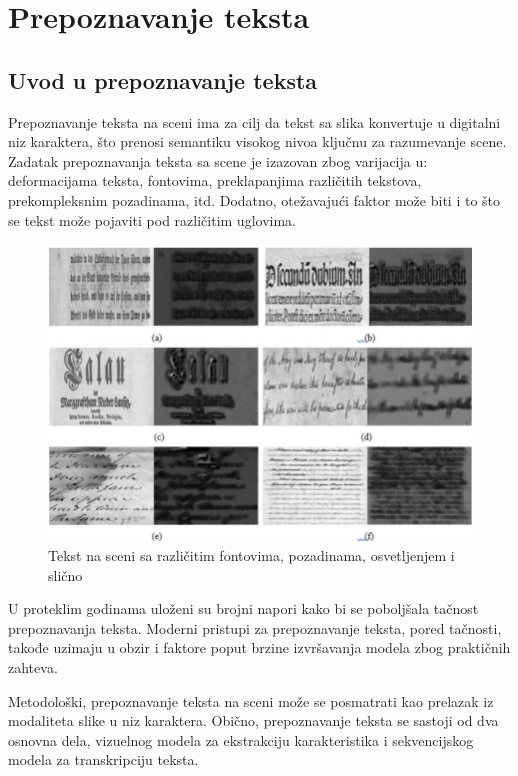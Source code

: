 \documentclass[a4paper,12pt]{article}
\begin{document}
	\section{Prepoznavanje teksta}
	\subsection{Uvod u prepoznavanje teksta}
	Prepoznavanje teksta na sceni ima za cilj da tekst sa slika konvertuje u digitalni niz karaktera, što prenosi semantiku visokog nivoa ključnu za razumevanje scene. Zadatak prepoznavanja teksta sa scene je izazovan zbog varijacija u: deformacijama teksta, fontovima, preklapanjima različitih tekstova, prekompleksnim pozadinama, itd. Dodatno, otežavajući faktor može biti i to što se tekst može pojaviti pod različitim uglovima.
	
	\begin{figure}[H]
		\centering
		\includegraphics[width=\textwidth]{assets/text.png}
		\caption{Tekst na sceni sa različitim fontovima, pozadinama, osvetljenjem i slično}
		\label{fig:text-on-scene}
	\end{figure}
	
	U proteklim godinama uloženi su brojni napori kako bi se poboljšala tačnost prepoznavanja teksta. Moderni pristupi za prepoznavanje teksta, pored tačnosti, takođe uzimaju u obzir i faktore poput brzine izvršavanja modela zbog praktičnih zahteva.
	
	Metodološki, prepoznavanje teksta na sceni može se posmatrati kao prelazak iz modaliteta slike u niz karaktera. Obično, prepoznavanje teksta se sastoji od dva osnovna dela, vizuelnog modela za ekstrakciju karakteristika i sekvencijskog modela za transkripciju teksta.
	\newpage
	
\end{document}
